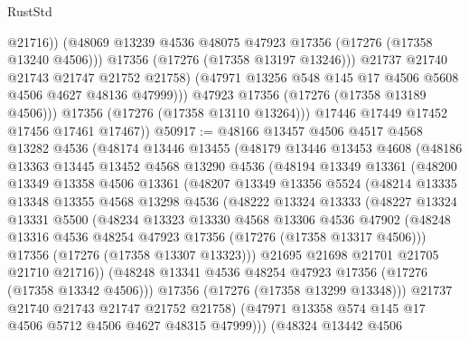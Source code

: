\begin{lexlean}{RustStd}
\begin{coremodule}
                        @21716))
                    (@48069 @13239 @4536 @48075 @47923 @17356 (@17276 (@17358 @13240 @4506)))
                    @17356
                    (@17276 (@17358 @13197 @13246)))
                  @21737
                  @21740
                  @21743
                  @21747
                  @21752
                  @21758)
                (@47971 @13256 @548 @145 @17 @4506 @5608 @4506 @4627 @48136 @47999)))
            @47923
            @17356
            (@17276 (@17358 @13189 @4506)))
          @17356
          (@17276 (@17358 @13110 @13264)))
        @17446
        @17449
        @17452
        @17456
        @17461
        @17467))
@50917 := @48166
    @13457
    @4506
    @4517
    @4568
    @13282
    @4536
    (@48174
      @13446
      @13455
      (@48179
        @13446
        @13453
        @4608
        (@48186
          @13363
          @13445
          @13452
          @4568
          @13290
          @4536
          (@48194
            @13349
            @13361
            (@48200
              @13349
              @13358
              @4506
              @13361
              (@48207
                @13349
                @13356
                @5524
                (@48214
                  @13335
                  @13348
                  @13355
                  @4568
                  @13298
                  @4536
                  (@48222
                    @13324
                    @13333
                    (@48227
                      @13324
                      @13331
                      @5500
                      (@48234
                        @13323
                        @13330
                        @4568
                        @13306
                        @4536
                        @47902
                        (@48248 @13316 @4536 @48254 @47923 @17356 (@17276 (@17358 @13317 @4506)))
                        @17356
                        (@17276 (@17358 @13307 @13323)))
                      @21695
                      @21698
                      @21701
                      @21705
                      @21710
                      @21716))
                  (@48248 @13341 @4536 @48254 @47923 @17356 (@17276 (@17358 @13342 @4506)))
                  @17356
                  (@17276 (@17358 @13299 @13348)))
                @21737
                @21740
                @21743
                @21747
                @21752
                @21758)
              (@47971 @13358 @574 @145 @17 @4506 @5712 @4506 @4627 @48315 @47999)))
          (@48324
            @13442
            @4506

\end{coremodule}
\end{lexlean}
